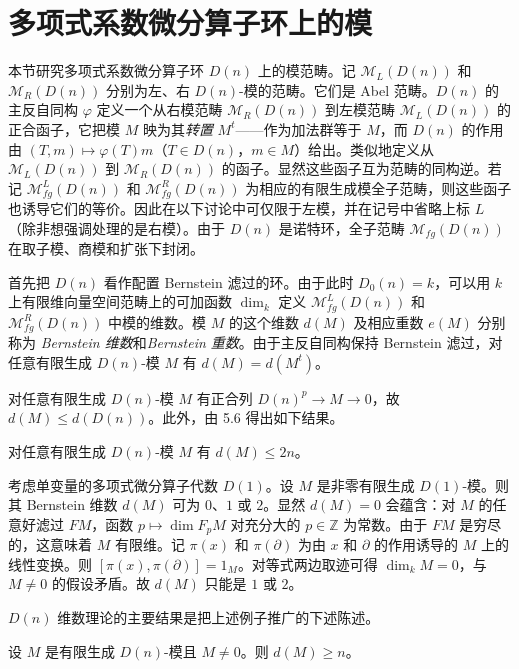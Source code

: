 \section{多项式系数微分算子环上的模}

本节研究多项式系数微分算子环 $D(n)$ 上的模范畴。记 $\mathcal{M}_L(D(n))$ 和 $\mathcal{M}_R(D(n))$ 分别为左、右 $D(n)$-模的范畴。它们是 Abel 范畴。$D(n)$ 的主反自同构 $\varphi$ 定义一个从右模范畴 $\mathcal{M}_R(D(n))$ 到左模范畴 $\mathcal{M}_L(D(n))$ 的正合函子，它把模 $M$ 映为其\emph{转置} $M^t$——作为加法群等于 $M$，而 $D(n)$ 的作用由 $(T,m)\longmapsto\varphi(T)m$（$T\in D(n)$，$m\in M$）给出。类似地定义从 $\mathcal{M}_L(D(n))$ 到 $\mathcal{M}_R(D(n))$ 的函子。显然这些函子互为范畴的同构逆。若记 $\mathcal{M}_{fg}^L(D(n))$ 和 $\mathcal{M}_{fg}^R(D(n))$ 为相应的有限生成模全子范畴，则这些函子也诱导它们的等价。因此在以下讨论中可仅限于左模，并在记号中省略上标 $L$（除非想强调处理的是右模）。由于 $D(n)$ 是诺特环，全子范畴 $\mathcal{M}_{fg}(D(n))$ 在取子模、商模和扩张下封闭。

首先把 $D(n)$ 看作配置 Bernstein 滤过的环。由于此时 $D_0(n)=k$，可以用 $k$ 上有限维向量空间范畴上的可加函数 $\dim_k$ 定义 $\mathcal{M}_{fg}^L(D(n))$ 和 $\mathcal{M}_{fg}^R(D(n))$ 中模的维数。模 $M$ 的这个维数 $d(M)$ 及相应重数 $e(M)$ 分别称为 \emph{Bernstein 维数}和\emph{Bernstein 重数}。由于主反自同构保持 Bernstein 滤过，对任意有限生成 $D(n)$-模 $M$ 有 $d(M)=d(M^t)$。

对任意有限生成 $D(n)$-模 $M$ 有正合列 $D(n)^p\longrightarrow M\longrightarrow 0$，故 $d(M)\le d(D(n))$。此外，由 5.6 得出如下结果。

\begin{lemma}
对任意有限生成 $D(n)$-模 $M$ 有 $d(M)\le 2n$。
\end{lemma}

\begin{example}
考虑单变量的多项式微分算子代数 $D(1)$。设 $M$ 是非零有限生成 $D(1)$-模。则其 Bernstein 维数 $d(M)$ 可为 $0$、$1$ 或 $2$。显然 $d(M)=0$ 会蕴含：对 $M$ 的任意好滤过 $F M$，函数 $p\longmapsto\dim F_p M$ 对充分大的 $p\in\mathbb{Z}$ 为常数。由于 $F M$ 是穷尽的，这意味着 $M$ 有限维。记 $\pi(x)$ 和 $\pi(\partial)$ 为由 $x$ 和 $\partial$ 的作用诱导的 $M$ 上的线性变换。则 $[\pi(x),\pi(\partial)]=1_M$。对等式两边取迹可得 $\dim_k M=0$，与 $M\neq 0$ 的假设矛盾。故 $d(M)$ 只能是 $1$ 或 $2$。
\end{example}

$D(n)$ 维数理论的主要结果是把上述例子推广的下述陈述。

\begin{theorem}[Bernstein]
设 $M$ 是有限生成 $D(n)$-模且 $M\neq 0$。则 $d(M)\ge n$。
\end{theorem}


